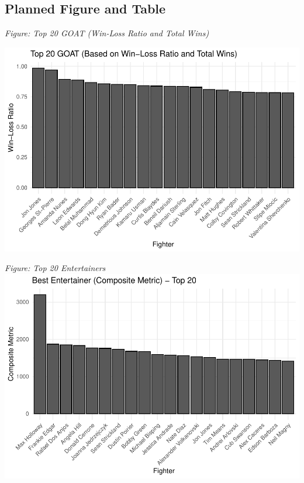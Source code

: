 \documentclass[
  man,floatsintext]{apa6}
\begin{document}
\hypertarget{planned-figure-and-table}{%
\subsection{Planned Figure and Table}\label{planned-figure-and-table}}

\emph{Figure: Top 20 GOAT (Win-Loss Ratio and Total Wins)}

\includegraphics{Into-the-UFC--outline-_files/figure-latex/unnamed-chunk-1-1.pdf}

\emph{Figure: Top 20 Entertainers}
\includegraphics{Into-the-UFC--outline-_files/figure-latex/unnamed-chunk-2-1.pdf}
\end{document}
